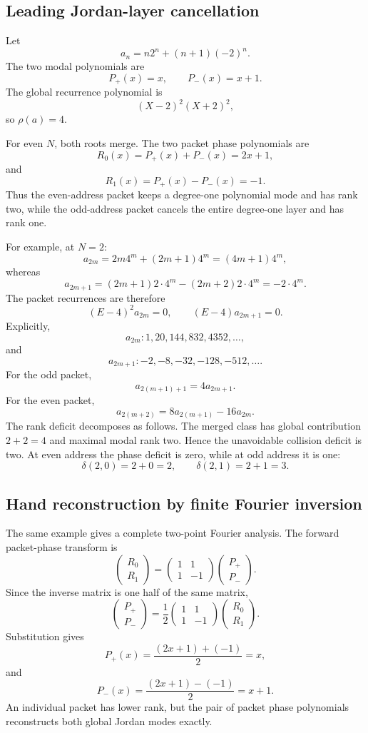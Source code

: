 \documentclass[11pt]{article}
\theoremstyle{definition}\newtheorem{definition}[theorem]{Definition}\newtheorem{example}[theorem]{Example}\newtheorem{construction}[theorem]{Construction}\newtheorem{algorithm}[theorem]{Algorithm}\newtheorem{conjecture}[theorem]{Conjecture}\newtheorem{problem}[theorem]{Problem}
\theoremstyle{remark}\newtheorem{remark}[theorem]{Remark}\newtheorem{boundary}[theorem]{Boundary}\newtheorem{certificate}[theorem]{Computational Certificate}\newtheorem{classical}[theorem]{Classical Input}\newtheorem{principle}[theorem]{Structural Principle}
\begin{document}
\subsection{Leading Jordan-layer cancellation}
Let
\[
 a_n=n2^n+(n+1)(-2)^n.
\]
The two modal polynomials are
\[
 P_+(x)=x,
 \qquad
 P_-(x)=x+1.
\]
The global recurrence polynomial is
\[
 (X-2)^2(X+2)^2,
\]
so $\rho(a)=4$.

For even $N$, both roots merge.  The two packet phase polynomials are
\[
 R_0(x)=P_+(x)+P_-(x)=2x+1,
\]
and
\[
 R_1(x)=P_+(x)-P_-(x)=-1.
\]
Thus the even-address packet keeps a degree-one polynomial mode and has rank two, while the odd-address packet cancels the entire degree-one layer and has rank one.

For example, at $N=2$:
\[
 a_{2m}=2m4^m+(2m+1)4^m=(4m+1)4^m,
\]
whereas
\[
 a_{2m+1}=(2m+1)2\cdot4^m-(2m+2)2\cdot4^m=-2\cdot4^m.
\]
The packet recurrences are therefore
\[
 (E-4)^2a_{2m}=0,
 \qquad
 (E-4)a_{2m+1}=0.
\]
Explicitly,
\[
 a_{2m}:1,20,144,832,4352,\ldots,
\]
and
\[
 a_{2m+1}:-2,-8,-32,-128,-512,\ldots.
\]
For the odd packet,
\[
 a_{2(m+1)+1}=4a_{2m+1}.
\]
For the even packet,
\[
 a_{2(m+2)}=8a_{2(m+1)}-16a_{2m}.
\]
The rank deficit decomposes as follows.  The merged class has global contribution $2+2=4$ and maximal modal rank two.  Hence the unavoidable collision deficit is two.  At even address the phase deficit is zero, while at odd address it is one:
\[
 \delta(2,0)=2+0=2,
 \qquad
 \delta(2,1)=2+1=3.
\]

\subsection{Hand reconstruction by finite Fourier inversion}
The same example gives a complete two-point Fourier analysis.  The forward packet-phase transform is
\[
 \begin{pmatrix}R_0\\R_1\end{pmatrix}
 =
 \begin{pmatrix}1&1\\1&-1\end{pmatrix}
 \begin{pmatrix}P_+\\P_-\end{pmatrix}.
\]
Since the inverse matrix is one half of the same matrix,
\[
 \begin{pmatrix}P_+\\P_-\end{pmatrix}
 =
 \frac12
 \begin{pmatrix}1&1\\1&-1\end{pmatrix}
 \begin{pmatrix}R_0\\R_1\end{pmatrix}.
\]
Substitution gives
\[
 P_+(x)=\frac{(2x+1)+(-1)}2=x,
\]
and
\[
 P_-(x)=\frac{(2x+1)-(-1)}2=x+1.
\]
An individual packet has lower rank, but the pair of packet phase polynomials reconstructs both global Jordan modes exactly.
\end{document}
